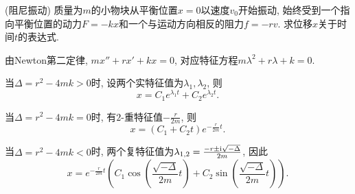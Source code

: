 \begin{example}
	(阻尼振动) 质量为$m$的小物块从平衡位置$x=0$以速度$v_0$开始振动, 始终受到一个指向平衡位置的动力$F=-kx$和一个与运动方向相反的阻力$f=-r v$. 求位移$x$关于时间$t$的表达式. 
\end{example}
\begin{solution}
	由Newton第二定律, $mx''+rx'+kx=0$, 对应特征方程$m\lambda ^2+r\lambda +k=0$. 
	
	当$\Delta = r^2-4mk>0$时, 设两个实特征值为$\lambda _1,\lambda _2$, 则$$x=C_1e^{\lambda _1t}+C_2e^{\lambda _2t}.$$
	
	当$\Delta = r^2-4mk=0$时, 有$2$-重特征值$-\frac{r}{2m}$, 则$$x=(C_1+C_2t)e^{-\frac{r}{2m}t}.$$
	
	当$\Delta = r^2-4mk<0$时, 两个复特征值为$\lambda_{1,2}=\frac{-r\pm \mathrm{i} \sqrt{-\Delta}}{2m}$, 因此$$x=e^{-\frac{r}{2m}t}\left( C_1\cos \left( \frac{\sqrt{-\Delta}}{2m}t \right)+C_2\sin \left( \frac{\sqrt{-\Delta}}{2m}t \right) \right).$$
\end{solution}










































